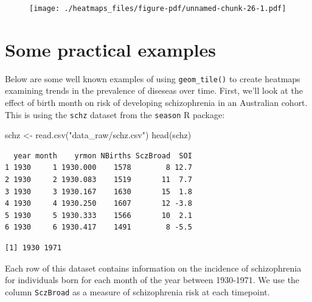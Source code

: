 \documentclass[
  letterpaper,
  DIV=11,
  numbers=noendperiod]{scrreprt}
\newenvironment{Shaded}{\begin{snugshade}}{\end{snugshade}}
\newcommand{\FunctionTok}[1]{\textcolor[rgb]{0.28,0.35,0.67}{#1}}
\newcommand{\NormalTok}[1]{\textcolor[rgb]{0.00,0.23,0.31}{#1}}
\newcommand{\OtherTok}[1]{\textcolor[rgb]{0.00,0.23,0.31}{#1}}
\newcommand{\SpecialCharTok}[1]{\textcolor[rgb]{0.37,0.37,0.37}{#1}}
\newcommand{\StringTok}[1]{\textcolor[rgb]{0.13,0.47,0.30}{#1}}
\begin{document}
\begin{figure}[H]

{\centering \texttt{[image: ./heatmaps\_files/figure-pdf/unnamed-chunk-26-1.pdf]}

}

\end{figure}

\hypertarget{some-practical-examples}{%
\section{\texorpdfstring{\textbf{Some practical
examples}}{Some practical examples}}\label{some-practical-examples}}

Below are some well known examples of using \texttt{geom\_tile()} to
create heatmaps examining trends in the prevalence of diseseas over
time. First, we'll look at the effect of birth month on risk of
developing schizophrenia in an Australian cohort. This is using the
\texttt{schz} dataset from the \texttt{season} R package:

\begin{Shaded}
\begin{Highlighting}[]
\NormalTok{schz }\OtherTok{\textless{}{-}} \FunctionTok{read.csv}\NormalTok{(}\StringTok{"data\_raw/schz.csv"}\NormalTok{)}
\FunctionTok{head}\NormalTok{(schz)}
\end{Highlighting}
\end{Shaded}

\begin{verbatim}
  year month    yrmon NBirths SczBroad  SOI
1 1930     1 1930.000    1578        8 12.7
2 1930     2 1930.083    1519       11  7.7
3 1930     3 1930.167    1630       15  1.8
4 1930     4 1930.250    1607       12 -3.8
5 1930     5 1930.333    1566       10  2.1
6 1930     6 1930.417    1491        8 -5.5
\end{verbatim}

\begin{Shaded}
\end{Shaded}

\begin{verbatim}
[1] 1930 1971
\end{verbatim}

Each row of this dataset contains information on the incidence of
schizophrenia for individuals born for each month of the year between
1930-1971. We use the column \texttt{SczBroad} as a measure of
schizophrenia risk at each timepoint.
\end{document}
